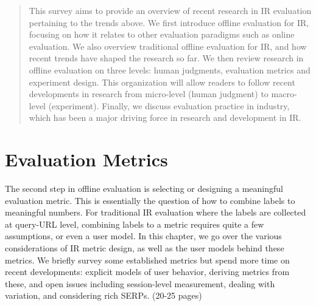 \documentclass[openany]{now} %
\newcommand{\authornote}[3]{\marginpar{\tiny\color{#1}#2: #3}{\color{#1}{$\star$}}}
\newcommand{\emine}[1]{\authornote{green}{Emine}{#1}}
\newcommand{\paul}[1]{\authornote{blue}{Paul}{#1}}
\begin{document}
\begin{abstract}
This survey aims to provide an overview of recent research in IR evaluation pertaining to the trends above. We first introduce offline evaluation for IR, focusing on how it relates to other evaluation paradigms such as online evaluation. We also overview traditional offline evaluation for IR, and how recent trends have shaped the research so far. We then review research in offline evaluation on three levels: human judgments, evaluation metrics and experiment design. This organization will allow readers to follow recent developments in research from micro-level (human judgment) to macro-level (experiment). Finally, we discuss evaluation practice in industry, which has been a major driving force in research and development in IR.

\end{abstract}






\chapter{Evaluation Metrics}
\label{c-metric}

The second step in offline evaluation is selecting or designing a meaningful evaluation metric. This is essentially the question of how to combine labels to meaningful numbers. For traditional IR evaluation where the labels are collected at query-URL level, combining labels to a metric requires quite a few assumptions, or even a user model. In this chapter, we go over the various considerations of IR metric design, as well as the user models behind these metrics. We briefly survey some established metrics but spend more time on recent developments: explicit models of user behavior, deriving metrics from these, and open issues including session-level measurement, dealing with variation, and considering rich SERPs. (20-25 pages)
\end{document}
